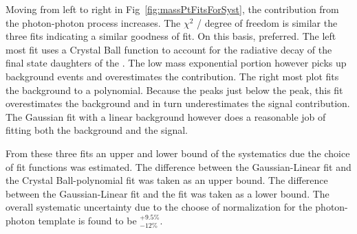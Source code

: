    Moving from left to right in Fig~\ref{fig:massPtFitsForSyst}, the 
      contribution from the photon-photon process increases.
    The $\chi^{2}$ / degree of freedom is similar \DIFdelbegin {}\DIFdelend \DIFaddbegin {}\DIFaddend the three 
      fits indicating a similar goodness of fit.
    On this basis, \DIFdelbegin {}\DIFdelend \DIFaddbegin {}\DIFaddend preferred. 
    The left most fit uses a Crystal Ball function to account for the 
      radiative decay of the final state daughters of the \JPsi{}.
    The low mass exponential portion however picks up background events 
      and overestimates the \JPsi{} contribution. 
    The right most plot fits the background to a \DIFdelbegin {}\DIFdelend \DIFaddbegin {}\DIFaddend polynomial.
    Because the \DIFdelbegin {}\DIFdelend \DIFaddbegin {}\DIFaddend peaks just below the \JPsi{} peak, this fit 
      overestimates the background and in turn underestimates the signal 
      contribution.
    The Gaussian fit with a linear background however does a reasonable job
      of fitting both the background and the signal. 

    From these three fits an upper and lower bound of the systematics due
      the choice of fit functions was estimated. 
    The difference between the Gaussian-Linear fit and the 
      Crystal Ball-polynomial fit was taken as an upper bound. 
    The difference between the Gaussian-Linear fit and the 
        \DIFdelbegin {}\DIFdelend \DIFaddbegin {}\DIFaddend fit was taken as a lower bound. 
    The overall systematic uncertainty due to the choose of normalization for
      the photon-photon template is found to be $^{+9.5\%}_{-12\%}$.

